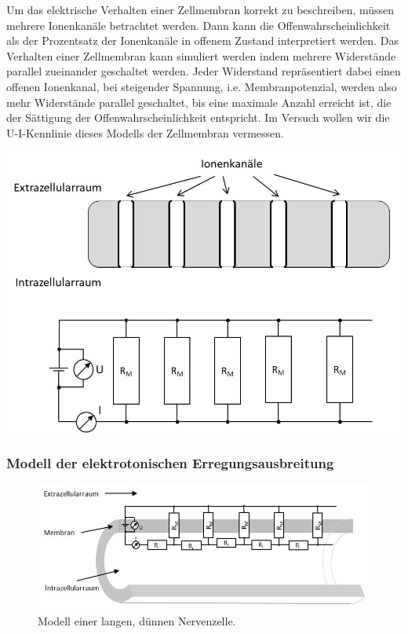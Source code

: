 \begin{minipage}{0.4\textwidth}
Um das elektrische Verhalten einer Zellmembran korrekt zu beschreiben, müssen mehrere Ionenkanäle betrachtet werden. Dann kann die Offenwahrscheinlichkeit als der Prozentsatz der Ionenkanäle in offenem Zustand interpretiert werden. Das Verhalten einer Zellmembran kann simuliert werden indem mehrere Widerstände parallel zueinander geschaltet werden. Jeder Widerstand repräsentiert dabei einen offenen Ionenkanal, bei steigender Spannung, i.e. Membranpotenzial, werden also mehr Widerstände parallel geschaltet, bis eine maximale Anzahl erreicht ist, die der Sättigung der Offenwahrscheinlichkeit entspricht. Im Versuch wollen wir die U-I-Kennlinie dieses Modells der Zellmembran vermessen.
\end{minipage}
\hfill
%
\begin{minipage}{0.55\textwidth}
		\includegraphics[width=1.00\textwidth]{figures/Membrankanaele.jpg}
	\label{fig:Membrankanaele}
\end{minipage}


\subsubsection{Modell der elektrotonischen Erregungsausbreitung}

\begin{figure}[htbp]
	\centering
		\includegraphics[width=1.00\textwidth]{figures/Axon.jpg}
	\caption{Modell einer langen, dünnen Nervenzelle.}
	\label{fig:Axon}
\end{figure}


